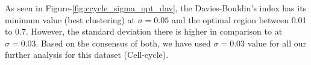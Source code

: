 As seen in Figure-\ref{fig:ccycle_sigma_opt_dav}, the Davies-Bouldin's index has its minimum value (best clustering) at $\sigma=0.05$ and the optimal region between 0.01 to 0.7. However, the standard deviation there is higher in comparison to at $\sigma=0.03$. 
Based on the consensus of both, we have used $\sigma=0.03$ value for all our further analysis for this dataset (Cell-cycle). 

